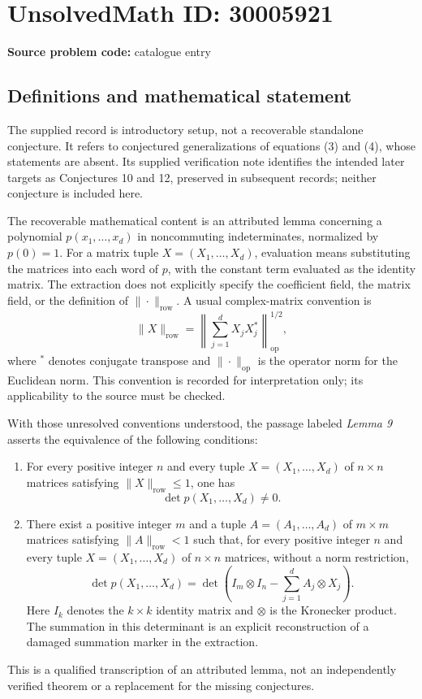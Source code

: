 \documentclass[11pt]{article}
\begin{document}
\section*{UnsolvedMath ID: 30005921}
\textbf{Source problem code:} catalogue entry
\subsection{Definitions and mathematical statement}
The supplied record is introductory setup, not a recoverable standalone conjecture. It refers to conjectured generalizations of equations (3) and (4), whose statements are absent. Its supplied verification note identifies the intended later targets as Conjectures 10 and 12, preserved in subsequent records; neither conjecture is included here.

The recoverable mathematical content is an attributed lemma concerning a polynomial \(p(x_1,\ldots,x_d)\) in noncommuting indeterminates, normalized by \(p(0)=1\). For a matrix tuple \(X=(X_1,\ldots,X_d)\), evaluation means substituting the matrices into each word of \(p\), with the constant term evaluated as the identity matrix. The extraction does not explicitly specify the coefficient field, the matrix field, or the definition of \(\|\cdot\|_{\mathrm{row}}\). A usual complex-matrix convention is
\[
\|X\|_{\mathrm{row}}=\left\|\sum_{j=1}^{d}X_jX_j^*\right\|_{\mathrm{op}}^{1/2},
\]
where \(^*\) denotes conjugate transpose and \(\|\cdot\|_{\mathrm{op}}\) is the operator norm for the Euclidean norm. This convention is recorded for interpretation only; its applicability to the source must be checked.

With those unresolved conventions understood, the passage labeled \emph{Lemma 9} asserts the equivalence of the following conditions:
\begin{enumerate}
\item For every positive integer \(n\) and every tuple \(X=(X_1,\ldots,X_d)\) of \(n\times n\) matrices satisfying \(\|X\|_{\mathrm{row}}\leq 1\), one has
\[
\det p(X_1,\ldots,X_d)\ne 0.
\]
\item There exist a positive integer \(m\) and a tuple \(A=(A_1,\ldots,A_d)\) of \(m\times m\) matrices satisfying \(\|A\|_{\mathrm{row}}<1\) such that, for every positive integer \(n\) and every tuple \(X=(X_1,\ldots,X_d)\) of \(n\times n\) matrices, without a norm restriction,
\[
\det p(X_1,\ldots,X_d)
=
\det\!\left(I_m\otimes I_n-\sum_{j=1}^{d}A_j\otimes X_j\right).
\]
Here \(I_k\) denotes the \(k\times k\) identity matrix and \(\otimes\) is the Kronecker product. The summation in this determinant is an explicit reconstruction of a damaged summation marker in the extraction.
\end{enumerate}
This is a qualified transcription of an attributed lemma, not an independently verified theorem or a replacement for the missing conjectures.
\end{document}
